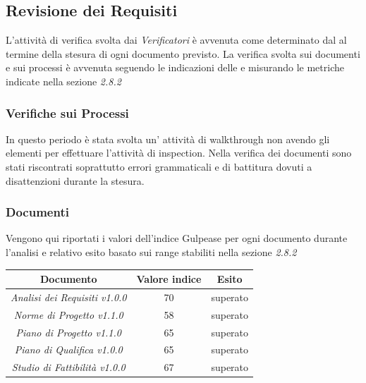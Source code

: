 {  \subsection{Revisione dei Requisiti}

  L'attività di verifica svolta dai  \emph{Verificatori}  è avvenuta come determinato dal \emph{\pianodiprogetto} al termine della stesura di ogni documento previsto. La verifica svolta sui documenti e
  sui processi è avvenuta seguendo le indicazioni delle  \emph{\normediprogetto}  e misurando le
  metriche indicate nella sezione \emph{2.8.2}

  \subsubsection{Verifiche sui Processi}

  In questo periodo è stata svolta un' attività di walkthrough non avendo gli elementi
  per effettuare l'attività di inspection. Nella verifica dei
  documenti sono stati riscontrati soprattutto errori grammaticali e
  di battitura dovuti a disattenzioni durante la stesura. 

  \subsubsection{Documenti}
  Vengono qui riportati i valori dell'indice Gulpease per ogni documento durante l’analisi e relativo
  esito basato sui range stabiliti nella sezione \emph{2.8.2}
  \begin{center}
    \begin{tabular}{|c|c|c|}
      \hline
      \textbf{Documento} & \textbf{Valore indice} & \textbf{Esito} \\
      \hline
      \emph{Analisi dei Requisiti v1.0.0}  & 70 & superato \\
      \hline
      \emph{Norme di Progetto v1.1.0}   & 58  & superato \\
      \hline
      \emph{Piano di Progetto v1.1.0}   & 65 & superato \\
      \hline
      \emph{Piano di Qualifica v1.0.0}   & 65 & superato \\
      \hline
      \emph{Studio di Fattibilità v1.0.0}  & 67 & superato \\
      \hline
    \end{tabular}
  \end{center}



}
